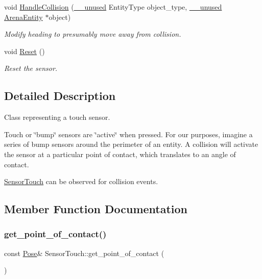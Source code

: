 \begin{DoxyCompactItemize}
void \mbox{\hyperlink{class_sensor_touch_a1980b126f7c6d0e6bdf75f1bb59fe5c2}{Handle\+Collision}} (\mbox{\hyperlink{common_8h_a2e3484535ee610c8e19e9859563abe48}{\+\_\+\+\_\+unused}} Entity\+Type object\+\_\+type, \mbox{\hyperlink{common_8h_a2e3484535ee610c8e19e9859563abe48}{\+\_\+\+\_\+unused}} \mbox{\hyperlink{class_arena_entity}{Arena\+Entity}} $\ast$object)
\begin{DoxyCompactList}\small\item\em Modify heading to presumably move away from collision. \end{DoxyCompactList}\item 
\mbox{\label{class_sensor_touch_ad0054916c97844a51052e5dee63f68b9}} 
void \mbox{\hyperlink{class_sensor_touch_ad0054916c97844a51052e5dee63f68b9}{Reset}} ()
\begin{DoxyCompactList}\small\item\em Reset the sensor. \end{DoxyCompactList}\end{DoxyCompactItemize}


\subsection{Detailed Description}
Class representing a touch sensor. 

Touch or \char`\"{}bump\char`\"{} sensors are \char`\"{}active\char`\"{} when pressed. For our purposes, imagine a series of bump sensors around the perimeter of an entity. A collision will activate the sensor at a particular point of contact, which translates to an angle of contact.

\mbox{\hyperlink{class_sensor_touch}{Sensor\+Touch}} can be observed for collision events. 

\subsection{Member Function Documentation}
\mbox{\label{class_sensor_touch_a9f56fd943758125611863ce2bc0d9365}} 
\subsubsection{\texorpdfstring{get\+\_\+point\+\_\+of\+\_\+contact()}{get\_point\_of\_contact()}}
{\footnotesize\ttfamily const \mbox{\hyperlink{struct_pose}{Pose}}\& Sensor\+Touch\+::get\+\_\+point\+\_\+of\+\_\+contact (\begin{DoxyParamCaption}{ }\end{DoxyParamCaption})\hspace{0.3cm}{\ttfamily [inline]}}



